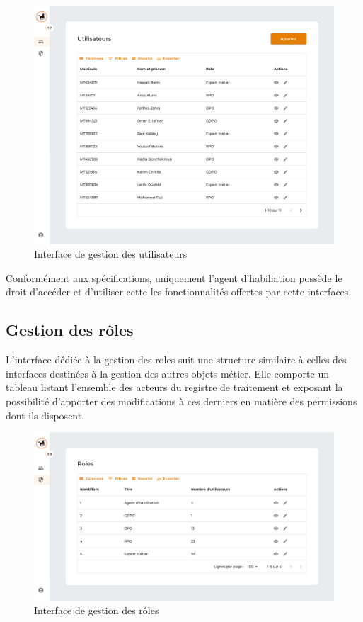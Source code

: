 \begin{figure}[H]
    \centering
    \includegraphics[width=\textwidth]{images/guis/utilisateurs.png}
    \caption{Interface de gestion des utilisateurs}
\end{figure}

\noindent Conformément aux spécifications, uniquement l'agent d'habiliation possède le droit d'accéder et d'utiliser cette les fonctionnalités offertes par cette interfaces.




\clearpage


\subsection{Gestion des rôles}

L'interface dédiée à la gestion des roles suit une structure similaire à celles des interfaces destinées à la gestion des autres objets métier. Elle comporte un tableau listant l'ensemble des acteurs du registre de traitement et exposant la possibilité d'apporter des modifications à ces derniers en matière des permissions dont ils disposent. \\

\begin{figure}[H]
    \centering
    \includegraphics[width=\textwidth]{images/guis/roles.png}
    \caption{Interface de gestion des rôles}
\end{figure}


